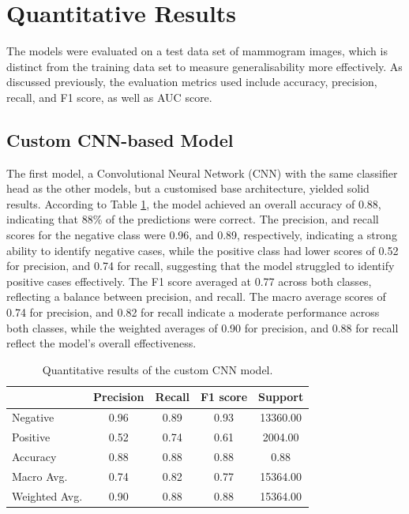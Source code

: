 \documentclass[../main]{subfiles}
\begin{document}
\section{Quantitative Results}
\label{sec:quantitative-results}
The models were evaluated on a test data set of mammogram images, which is distinct from the training data set to measure generalisability more effectively. As discussed previously, the evaluation metrics used include accuracy, precision, recall, and F1 score, as well as AUC score.

\subsection{Custom CNN-based Model}
The first model, a Convolutional Neural Network (CNN) with the same classifier head as the other models, but a customised base architecture, yielded solid results. According to Table \ref{tab:quantitative-results-custom-cnn}, the model achieved an overall accuracy of 0.88, indicating that 88\% of the predictions were correct. The precision, and recall scores for the negative class were 0.96, and 0.89, respectively, indicating a strong ability to identify negative cases, while the positive class had lower scores of 0.52 for precision, and 0.74 for recall, suggesting that the model struggled to identify positive cases effectively. The F1 score averaged at 0.77 across both classes, reflecting a balance between precision, and recall. The macro average scores of 0.74 for precision, and 0.82 for recall indicate a moderate performance across both classes, while the weighted averages of 0.90 for precision, and 0.88 for recall reflect the model's overall effectiveness.

\begin{table}[h!]
    \centering
    \begin{tabular}{|l|c|c|c|c|}
        \hline
         & Precision & Recall & F1 score & Support \\ \hline
        Negative & 0.96 & 0.89 & 0.93 & 13360.00 \\ \hline
        Positive & 0.52 & 0.74 & 0.61 & 2004.00 \\ \hline
        Accuracy & 0.88 & 0.88 & 0.88 & 0.88 \\ \hline
        Macro Avg. & 0.74 & 0.82 & 0.77 & 15364.00 \\ \hline
        Weighted Avg. & 0.90 & 0.88 & 0.88 & 15364.00 \\ \hline
    \end{tabular}
    \caption{Quantitative results of the custom CNN model.}
    \label{tab:quantitative-results-custom-cnn}
\end{table}
\end{document}
